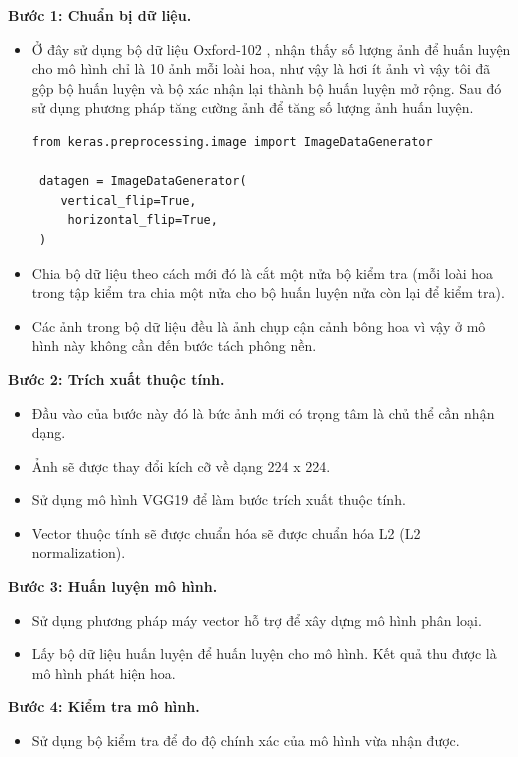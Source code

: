 \documentclass[12pt]{report}
\begin{document}
		\textbf{Bước 1: Chuẩn bị dữ liệu.} 
		\begin{itemize}
			\item Ở đây sử dụng bộ dữ liệu Oxford-102 \cite{cia-Nilsback06}, nhận thấy số lượng ảnh để huấn luyện cho mô hình chỉ là 10 ảnh mỗi loài hoa, như vậy là hơi ít ảnh vì vậy tôi đã gộp bộ huấn luyện và bộ xác nhận lại thành bộ huấn luyện mở rộng. Sau đó sử dụng phương pháp tăng cường ảnh \cite{cia_image_augmentation_2} để tăng số lượng ảnh huấn luyện.
\begin{lstlisting}
from keras.preprocessing.image import ImageDataGenerator

 datagen = ImageDataGenerator(
 	vertical_flip=True,
	 horizontal_flip=True,
 )
    		\end{lstlisting}			
			
			\item Chia bộ dữ liệu theo cách mới đó là cắt một nửa bộ kiểm tra (mỗi loài hoa trong tập kiểm tra chia một nửa cho bộ huấn luyện nửa còn lại để kiểm tra).
			\item Các ảnh trong bộ dữ liệu đều là ảnh chụp cận cảnh bông hoa vì vậy ở mô hình này không cần đến bước tách phông nền.
		\end{itemize}
										
		\textbf{Bước 2: Trích xuất thuộc tính.} 
		\begin{itemize}
			\item Đầu vào của bước này đó là bức ảnh mới có trọng tâm là chủ thể cần nhận dạng.
			\item Ảnh sẽ được thay đổi kích cỡ về dạng 224 x 224.
			\item Sử dụng mô hình VGG19 \cite{cia_vgg19} để làm bước trích xuất thuộc tính.
			\item Vector thuộc tính sẽ được chuẩn hóa sẽ được chuẩn hóa L2 (L2 normalization).
		\end{itemize}
										
		\textbf{Bước 3: Huấn luyện mô hình.} 
		\begin{itemize}
			\item Sử dụng phương pháp máy vector hỗ trợ để xây dựng mô hình phân loại.
			\item Lấy bộ dữ liệu huấn luyện để huấn luyện cho mô hình. Kết quả thu được là mô hình phát hiện hoa.
		\end{itemize}
										
		\textbf{Bước 4: Kiểm tra mô hình.} 
		\begin{itemize}
			\item Sử dụng bộ kiểm tra để đo độ chính xác của mô hình vừa nhận được.
		\end{itemize}
		
\end{document}
